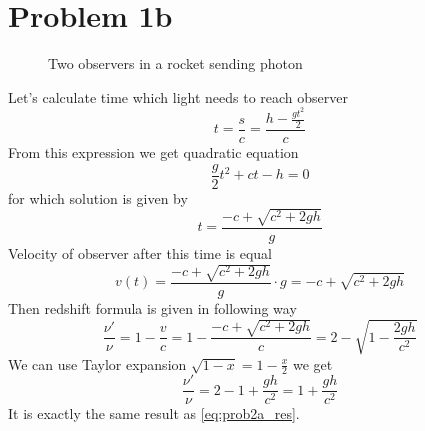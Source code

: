 \section*{Problem 1b}

\begin{wrapfigure}[16]{R}{0.5\linewidth}
    \centering
    \caption{Two observers in a rocket sending photon}
\end{wrapfigure}

Let's calculate time which light needs to reach observer 
%
\begin{equation}
    t = \frac{s}{c} = \frac{h - \frac{gt^2}{2}}{c}
\end{equation}
%
From this expression we get quadratic equation 
%
\begin{equation}
    \frac{g}{2}t^2 + ct - h = 0
\end{equation}
%
for which solution is given by
%
\begin{equation}
    t = \frac{-c + \sqrt{c^2+2gh}}{g}
\end{equation}
%
Velocity of observer  after this time is equal 
%
\begin{equation}
    v(t) = \frac{-c + \sqrt{c^2+2gh}}{g} \cdot g = -c + \sqrt{c^2+2gh}
\end{equation}
%
Then redshift formula is given in following way
%
\begin{equation}
    \frac{\nu'}{\nu} = 1 - \frac{v}{c} = 1 - \frac{-c + \sqrt{c^2+2gh}}{c} = 
    2 - \sqrt{1-\frac{2gh}{c^2}} 
\end{equation}
%
We can use Taylor expansion $\sqrt{1-x} = 1-\frac{x}{2}$ we get
%
\begin{equation}
    \frac{\nu'}{\nu} = 2 - 1 + \frac{gh}{c^2} = 1 + \frac{gh}{c^2} 
\end{equation}
%
It is exactly the same result as \autoref{eq:prob2a_res}.